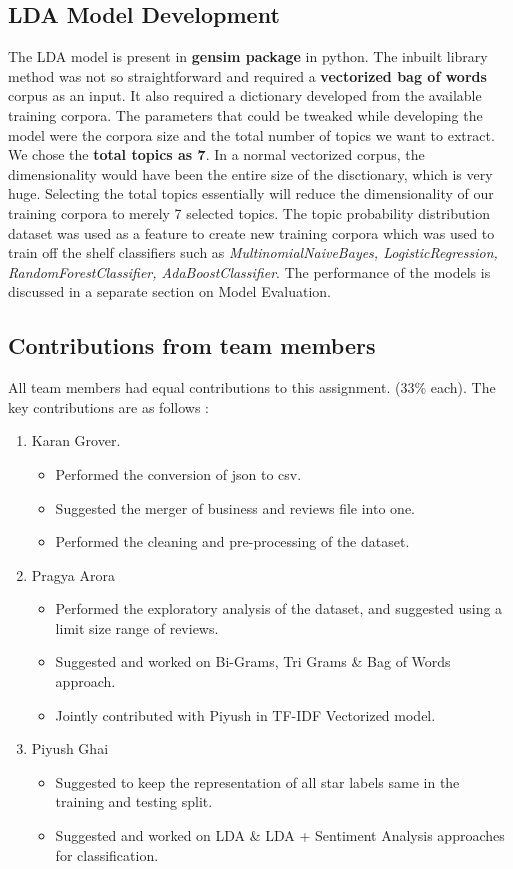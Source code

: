 \documentclass[paper=a4, fontsize=11pt]{scrartcl} %
\numberwithin{equation}{section} %
\numberwithin{figure}{section} %
\numberwithin{table}{section} %
\begin{document}
\subsection{LDA Model Development}
The LDA\cite{lda} model is present in \textbf{gensim package} in python. The inbuilt library method was not so straightforward and required a \textbf{vectorized bag of words} corpus as an input. It also required a dictionary developed from the available training corpora. The parameters that could be tweaked while developing the model were the corpora size and the total number of topics we want to extract. We chose the \textbf{total topics as 7}. In a normal vectorized corpus, the dimensionality would have been the entire size of the disctionary, which is very huge. Selecting the total topics essentially will reduce the dimensionality of our training corpora to merely 7 selected topics. The topic probability distribution dataset was used as a feature to create new training corpora which was used to train off the shelf classifiers such as \textit{MultinomialNaiveBayes, LogisticRegression, RandomForestClassifier, AdaBoostClassifier}. The performance of the models is discussed in a separate section on Model Evaluation.

\subsection{Contributions from team members}
All team members had equal contributions to this assignment. (33\% each). The key contributions are as follows : 
\begin{enumerate}
   \item Karan Grover.
   \begin{itemize}
     \item Performed the conversion of json to csv.
     \item Suggested the merger of business and reviews file into one.
     \item Performed the cleaning and pre-processing of the dataset.
   \end{itemize}
   \item Pragya Arora
   \begin{itemize}
   \item Performed the exploratory analysis of the dataset, and suggested using a limit size range of reviews.
   \item Suggested and worked on Bi-Grams, Tri Grams \& Bag of Words approach.
   \item Jointly contributed with Piyush in TF-IDF Vectorized model.
   \end{itemize}
   \item Piyush Ghai
   \begin{itemize}
   \item Suggested to keep the representation of all star labels same in the training and testing split.
   \item Suggested and worked on LDA \& LDA + Sentiment Analysis approaches for classification.
   \end{itemize}
\end{enumerate}
\end{document}
